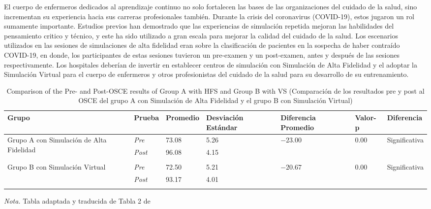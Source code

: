 El cuerpo de enfermeros dedicados al aprendizaje continuo no solo fortalecen las bases de las organizaciones del cuidado de la salud, sino incrementan su experiencia hacia sus carreras profesionales también. Durante la crisis del coronavirus (COVID-19), estos jugaron un rol sumamente importante. Estudios previos han demostrado que las experiencias de simulación repetida mejoran las habilidades del pensamiento critico y técnico, y este ha sido utilizado a gran escala para mejorar la calidad del cuidado de la salud. Los escenarios utilizados en las sesiones de simulaciones de alta fidelidad eran sobre la clasificación de pacientes en la sospecha de haber contraído COVID-19, en donde, los participantes de estas sesiones tuvieron un pre-examen y un post-examen, antes y después de las sesiones respectivamente. Los hospitales deberían de invertir en establecer centros de simulación con Simulación de Alta Fidelidad y el adoptar la Simulación Virtual para el cuerpo de enfermeros y otros profesionistas del cuidado de la salud para su desarrollo de su entrenamiento. \parencite{GUERRERO2022100002}
\begin{table}[H]
   \caption{Comparison of the Pre- and Post-OSCE results of Group A with HFS and Group B with VS (Comparación de los resultados pre y post al OSCE del grupo A con Simulación de Alta Fidelidad y el grupo B con Simulación Virtual)}
   \label{tab:tabla-enfermeros}
   \begin{center}
      \begin{tabular}{ p{3cm} p{1cm} p{2cm} p{2cm} p{2cm} p{1cm} p{1cm} }
         \hline
         Grupo & Prueba & Promedio & Desviación Estándar & Diferencia Promedio & Valor-p & Diferencia \\
         \hline
         \multirow{2}{3cm}{Grupo A con Simulación de Alta Fidelidad} & \textit{Pre}  & 73.08 & 5.26 & $-23.00$ & 0.00 & Significativa \\
                                             & \textit{Post} & 96.08 & 4.15 & ~      & ~    & ~            \\
                                             \\
         \multirow{2}{3cm}{Grupo B con Simulación Virtual}  & \textit{Pre}  & 72.50 & 5.21 & $-20.67$ & 0.00 & Significativa \\
                                             & \textit{Post} & 93.17 & 4.01 \\
                                             \\
         \hline
      \end{tabular}
   \end{center}
   \textit{Nota.} Tabla adaptada y traducida de Tabla 2 de \cite{GUERRERO2022100002}
\end{table}
